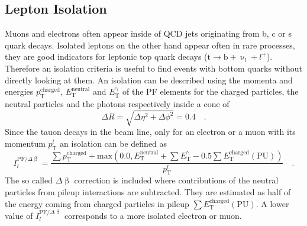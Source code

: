 \subsection{Lepton Isolation}\label{sec:ch_3:Isolation}
Muons and electrons often appear inside of QCD jets originating from b, c or s quark decays. Isolated leptons on the other hand appear often in rare processes, they are good indicators for leptonic top quark decays ($ \textrm{t} \rightarrow \textrm{b} + \upnu_l + l^+$). Therefore an isolation criteria is useful to find events with bottom quarks without directly looking at them. An isolation can be described using the momenta and energies $p_\textrm{T}^\textrm{charged}$, $E_\textrm{T}^\textrm{neutral}$ and $E_\textrm{T}^\upgamma$ of the PF elements for the charged particles, the neutral particles and the photons respectively inside a cone of 
\begin{equation}
\Delta R = \sqrt{\Delta\eta^2 + \Delta\phi^2} = 0.4 \quad .
\end{equation}
Since the tauon decays in the beam line, only for an electron or a muon with its momentum $p_\textrm{T}^l$ an isolation can be defined as
\begin{equation}
I_l^{\textrm{PF}/\Delta \upbeta} = \frac{\sum p_\textrm{T}^\textrm{charged} + \textrm{max} \left(0.0, E_\textrm{T}^\textrm{neutral} + \sum E_\textrm{T}^\upgamma - 0.5 \sum E_\textrm{T}^\textrm{charged}(\textrm{PU})\right) }{p_\textrm{T}^l} \quad .
\end{equation}
The so called $\Delta \upbeta$ correction is included where contributions of the neutral particles from pileup interactions are subtracted. They are estimated as half of the energy coming from charged particles in pileup $\sum E_\textrm{T}^\textrm{charged}(\textrm{PU})$. A lower value of $I_l^{\textrm{PF}/\Delta \upbeta}$ corresponds to a more isolated electron or muon.  



